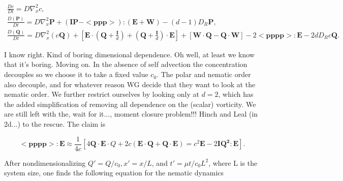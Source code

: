 \documentclass[onecolumn,showpacs,preprintnumbers,prl,amsmath,amssymb]{revtex4-1}
\def\b{\mathbf}
\begin{document}
\begin{gather}
\label{concen}
\frac{D c}{Dt}=D\nabla_x^2c,\\
\label{polar}
\frac{D(\b{P})}{Dt}=D\nabla_x^2\b{P}+(\b{IP}-<\b{ppp}>):(\b{E}+\b{W})-(d-1)D_R\b{P},\\
\label{nem}
\frac{D(\b{Q})}{Dt}=D\nabla_x^2(c\b{Q})+\left[\b{E}\cdot(\b{Q}+\frac{\b{I}}{d})+(\b{Q}+\frac{\b{I}}{d})\cdot\b{E}\right]+\left[\b{W}\cdot\b{Q}-\b{Q}\cdot\b{W}\right]-2<\b{pppp}>:\b{E}-2dD_Rc\b{Q}.
\end{gather}

I know right.  Kind of boring dimensional dependence.  Oh well, at least we know that it's boring.  Moving on.  In the absence of self advection the concentration decouples so we choose it to take a fixed value $c_0$.  The polar and nematic order also decouple, and for whatever reason WG decide that they want to look at the nematic order.  We further restrict ourselves by looking only at $d=2$, which has the added simplification of removing all dependence on the (scalar) vorticity.  We are still left with the, wait for it..., moment closure problem!!!  Hinch and Leal (in 2d...) to the rescue.  The claim is

\begin{equation}\label{eq:hl2d}
<\b{pppp}>:\b{E}\approx \frac{1}{4 c}\left[4 \b{Q}\cdot\b{E}\cdot{Q}+2 c (\b{E}\cdot\b{Q}+\b{Q}\cdot\b{E}) =c^2 \b{E} -2\b{IQ^2}:\b{E}\right].
\end{equation}

After nondimensionalizing $Q'=Q/c_0, x'=x/L$, and $t'=\mu t/c_0 L^2$, where L is the system size, one finds the following equation for the nematic dynamics
\end{document}
